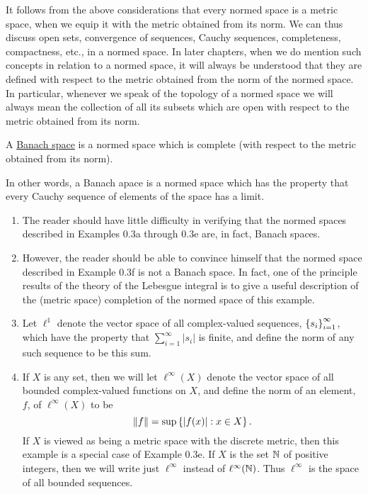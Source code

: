 It follows from the above considerations that every normed space is a metric space, when we equip it with the metric obtained from its norm. We can thus discuss open sets, convergence of sequences, Cauchy sequences, completeness, compactness, etc., in a normed space. In later chapters, when we do mention such concepts in relation to a normed space, it will always be understood that they are defined with respect to the metric obtained from the norm of the normed space. In particular, whenever we speak of the topology of a normed space we will always mean the collection of all its subsets which are open with respect to the metric obtained from its norm.

\begin{definition}
A \underline{Banach space} is a normed space which is complete (with respect to the metric obtained from its norm).
\end{definition}

In other words, a Banach apace is a normed space which has the property that every Cauchy sequence of elements of the space has a limit.


\begin{examples}
\begin{enumerate}
    \item The reader should have little difficulty in verifying that the normed spaces described in Examples 0.3a through 0.3e  are, in fact, Banach spaces. %
    \item However, the reader should be able to convince himself that the normed space described in Example 0.3f is not a Banach space. In fact, one of the principle results of the theory of the Lebesgue integral is to give a useful description of the (metric space) completion of the normed space of this example.
    \item Let $\ell^1$ denote the vector space of all complex-valued sequences, $\left\{s_i\right\}_{i=1}^\infty$, which have the property that $\sum_{i=1}^\infty|s_i|$ is finite, and define the norm of any such sequence to be this sum.
    \item If $X$ is any set, then we will let $\ell^\infty(X)$ denote the vector space of all bounded complex-valued functions on $X$, and define the norm of an element, $f$, of $\ell^\infty(X)$ to be $$\norm{f}=\sup\left\{|f(x)|:x\in X\right\}.$$ If $X$ is viewed as being a metric space with the discrete metric, then this example is a special case of Example 0.3e. If $X$ is the set $\mathbb{N}$ of positive integers, then we will write just $\ell^\infty$ instead of $\ell^\infty(\mathbb{N})$. Thus $\ell^\infty$ is the space of all bounded sequences. %
\end{enumerate} 
\end{examples}

